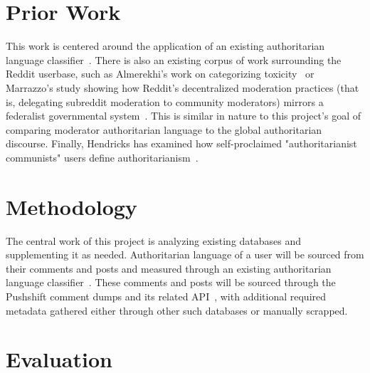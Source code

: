 \documentclass[letterpaper,twocolumn,10pt]{article}
\begin{document}
\section{Prior Work}

This work is centered around the application of an existing authoritarian language classifier~\cite{classifier}. There is also an existing corpus of work surrounding the Reddit userbase, such as Almerekhi's work on categorizing toxicity~\cite{reddit-toxicity} or Marrazzo's study showing how Reddit's decentralized moderation practices (that is, delegating subreddit moderation to community moderators) mirrors a federalist governmental system~\cite{federalist}. This is similar in nature to this project's goal of comparing moderator authoritarian language to the global authoritarian discourse. Finally, Hendricks has examined how self-proclaimed "authoritarianist communists" users define authoritarianism~\cite{communists}.

\section{Methodology}


The central work of this project is analyzing existing databases and supplementing it as needed. Authoritarian language of a user will be sourced from their comments and posts and measured through an existing authoritarian language classifier~\cite{classifier}. These comments and posts will be sourced through the Pushshift comment dumps and its related API~\cite{pushshift, dump}, with additional required metadata gathered either through other such databases or manually scrapped.

\section{Evaluation}
\end{document}
